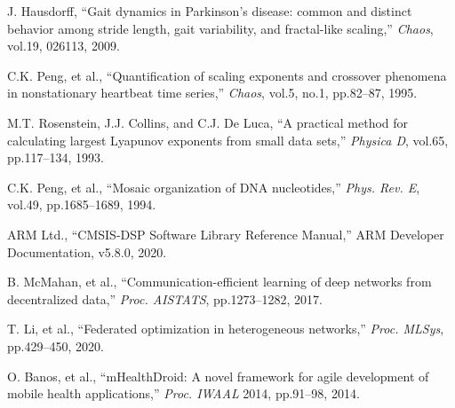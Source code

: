 \documentclass[paper]{ieice}
\begin{document}
\begin{thebibliography}{99}
J. Hausdorff, ``Gait dynamics in Parkinson's disease: common and distinct behavior among stride length, gait variability, and fractal-like scaling,'' \textit{Chaos}, vol.19, 026113, 2009.

C.K. Peng, et al., ``Quantification of scaling exponents and crossover phenomena in nonstationary heartbeat time series,'' \textit{Chaos}, vol.5, no.1, pp.82--87, 1995.

M.T. Rosenstein, J.J. Collins, and C.J. De Luca, ``A practical method for calculating largest Lyapunov exponents from small data sets,'' \textit{Physica D}, vol.65, pp.117--134, 1993.

C.K. Peng, et al., ``Mosaic organization of DNA nucleotides,'' \textit{Phys. Rev. E}, vol.49, pp.1685--1689, 1994.

ARM Ltd., ``CMSIS-DSP Software Library Reference Manual,'' ARM Developer Documentation, v5.8.0, 2020.

B. McMahan, et al., ``Communication-efficient learning of deep networks from decentralized data,'' \textit{Proc. AISTATS}, pp.1273--1282, 2017.

T. Li, et al., ``Federated optimization in heterogeneous networks,'' \textit{Proc. MLSys}, pp.429--450, 2020.

O. Banos, et al., ``mHealthDroid: A novel framework for agile development of mobile health applications,'' \textit{Proc. IWAAL} 2014, pp.91--98, 2014.

\end{thebibliography}
\end{document}
